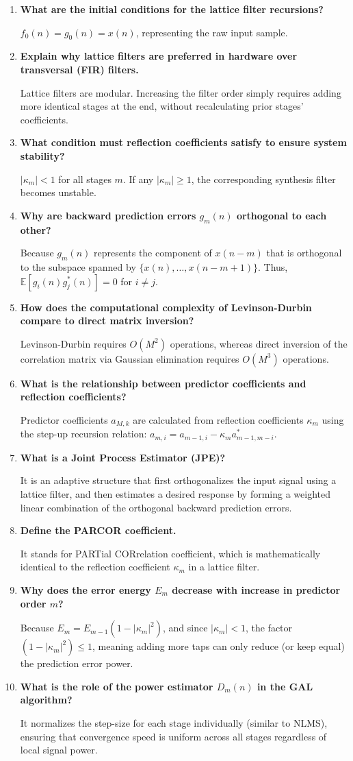 \documentclass[12pt,a4paper]{article}
\newcommand{\Q}[1]{\textbf{#1}\par\noindent\ignorespaces}
\begin{document}
\begin{tcolorbox}[exambox, title={\textbf{Frequently Asked / Viva Questions}}]
\begin{enumerate}[topsep=0pt, label=\textbf{Q\arabic*.}, itemsep=5pt]
  \item \Q{What are the initial conditions for the lattice filter recursions?}
    $f_0(n) = g_0(n) = x(n)$, representing the raw input sample.
  \item \Q{Explain why lattice filters are preferred in hardware over transversal (FIR) filters.}
    Lattice filters are modular. Increasing the filter order simply requires adding more identical stages at the end, without recalculating prior stages' coefficients.
  \item \Q{What condition must reflection coefficients satisfy to ensure system stability?}
    $|\kappa_m| < 1$ for all stages $m$. If any $|\kappa_m| \ge 1$, the corresponding synthesis filter becomes unstable.
  \item \Q{Why are backward prediction errors $g_m(n)$ orthogonal to each other?}
    Because $g_m(n)$ represents the component of $x(n-m)$ that is orthogonal to the subspace spanned by $\{x(n), \dots, x(n-m+1)\}$. Thus, $\mathbb{E}[g_i(n)g_j^*(n)] = 0$ for $i \ne j$.
  \item \Q{How does the computational complexity of Levinson-Durbin compare to direct matrix inversion?}
    Levinson-Durbin requires $O(M^2)$ operations, whereas direct inversion of the correlation matrix via Gaussian elimination requires $O(M^3)$ operations.
  \item \Q{What is the relationship between predictor coefficients and reflection coefficients?}
    Predictor coefficients $a_{M,k}$ are calculated from reflection coefficients $\kappa_m$ using the step-up recursion relation: $a_{m,i} = a_{m-1,i} - \kappa_m a_{m-1,m-i}^*$.
  \item \Q{What is a Joint Process Estimator (JPE)?}
    It is an adaptive structure that first orthogonalizes the input signal using a lattice filter, and then estimates a desired response by forming a weighted linear combination of the orthogonal backward prediction errors.
  \item \Q{Define the PARCOR coefficient.}
    It stands for PARTial CORrelation coefficient, which is mathematically identical to the reflection coefficient $\kappa_m$ in a lattice filter.
  \item \Q{Why does the error energy $E_m$ decrease with increase in predictor order $m$?}
    Because $E_m = E_{m-1}(1 - |\kappa_m|^2)$, and since $|\kappa_m| < 1$, the factor $(1 - |\kappa_m|^2) \le 1$, meaning adding more taps can only reduce (or keep equal) the prediction error power.
  \item \Q{What is the role of the power estimator $D_m(n)$ in the GAL algorithm?}
    It normalizes the step-size for each stage individually (similar to NLMS), ensuring that convergence speed is uniform across all stages regardless of local signal power.
\end{enumerate}
\end{tcolorbox}
\end{document}
